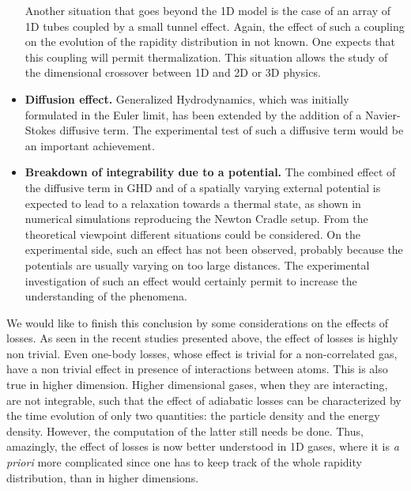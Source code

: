 \documentclass[onecolumn,amsfonts,showpacs,superscriptaddress]{revtex4-1}
\begin{document}
\begin{itemize}
        Another situation that goes beyond the 1D model is the case of an array of 1D tubes coupled by a small tunnel effect. Again, the effect of such a coupling on the evolution of the rapidity distribution in not known. One expects that this coupling will permit thermalization. This situation allows the study of the dimensional  crossover between 1D and 2D or 3D physics. 
        \item {\bf Diffusion effect.} Generalized Hydrodynamics, which was initially formulated in the Euler limit, has been extended by the addition of a Navier-Stokes diffusive term. The experimental test of such a diffusive term would be an important achievement.  
        \item {\bf Breakdown of integrability due to a potential. } The combined effect of the diffusive term in GHD and of a spatially varying  external potential is expected to lead to a relaxation towards a thermal state, as shown in numerical  simulations reproducing the Newton Cradle setup. 
        From the theoretical viewpoint different situations could be considered. On the experimental side, such an effect has not been observed, probably because the potentials are usually varying on too large distances. 
        The experimental investigation of such an effect would certainly permit to increase the understanding of the phenomena.
    \end{itemize}


We would like to finish this conclusion by some considerations on the effects of losses. As seen in the recent studies presented above, the effect of losses is highly non trivial. Even one-body losses, whose effect is trivial for a non-correlated gas, have a non trivial effect in presence of interactions between atoms. This is also true in higher dimension. Higher dimensional gases, when they are interacting, are not integrable, such that the effect of adiabatic losses can be characterized by the time evolution of only two quantities: the particle density and the energy density. However, the computation of the latter still needs be done. Thus, amazingly, the effect of losses is now better understood in 1D gases, where it is {\it a priori} more complicated since one has to keep track of the whole rapidity distribution, than in higher dimensions.
\end{document}

